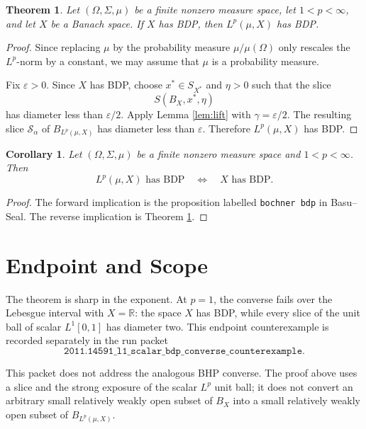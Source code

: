 \documentclass[11pt]{article}
\newtheorem{theorem}{Theorem}
\newtheorem{corollary}{Corollary}
\newcommand{\eps}{\varepsilon}
\begin{document}
\begin{theorem}\label{thm:bdp-positive}
Let \((\Omega,\Sigma,\mu)\) be a finite nonzero measure space, let \(1<p<\infty\), and let \(X\) be a Banach space.  If \(X\) has BDP, then \(L^p(\mu,X)\) has BDP.
\end{theorem}

\begin{proof}
Since replacing \(\mu\) by the probability measure \(\mu/\mu(\Omega)\) only rescales the \(L^p\)-norm by a constant, we may assume that \(\mu\) is a probability measure.

Fix \(\eps>0\).  Since \(X\) has BDP, choose \(x^*\in S_{X^*}\) and \(\eta>0\) such that the slice
\[
  S(B_X,x^*,\eta)
\]
has diameter less than \(\eps/2\).  Apply Lemma \ref{lem:lift} with \(\gamma=\eps/2\).  The resulting slice \(\mathcal S_\alpha\) of \(B_{L^p(\mu,X)}\) has diameter less than \(\eps\).  Therefore \(L^p(\mu,X)\) has BDP.
\end{proof}

\begin{corollary}\label{cor:equivalence}
Let \((\Omega,\Sigma,\mu)\) be a finite nonzero measure space and \(1<p<\infty\).  Then
\[
  L^p(\mu,X)\text{ has BDP}
  \quad\Longleftrightarrow\quad
  X\text{ has BDP}.
\]
\end{corollary}

\begin{proof}
The forward implication is the proposition labelled \texttt{bochner bdp} in Basu--Seal.  The reverse implication is Theorem \ref{thm:bdp-positive}.
\end{proof}

\section{Endpoint and Scope}

The theorem is sharp in the exponent.  At \(p=1\), the converse fails over the Lebesgue interval with \(X=\mathbb R\): the space \(X\) has BDP, while every slice of the unit ball of scalar \(L^1[0,1]\) has diameter two.  This endpoint counterexample is recorded separately in the run packet
\[
  \texttt{2011.14591\_l1\_scalar\_bdp\_converse\_counterexample}.
\]

This packet does not address the analogous BHP converse.  The proof above uses a slice and the strong exposure of the scalar \(L^p\) unit ball; it does not convert an arbitrary small relatively weakly open subset of \(B_X\) into a small relatively weakly open subset of \(B_{L^p(\mu,X)}\).
\end{document}
